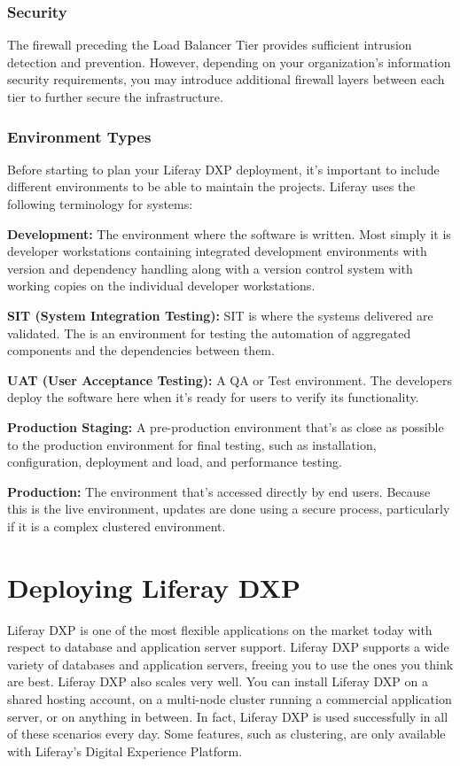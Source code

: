 \subsection{Security}\label{security}

The firewall preceding the Load Balancer Tier provides sufficient
intrusion detection and prevention. However, depending on your
organization's information security requirements, you may introduce
additional firewall layers between each tier to further secure the
infrastructure.

\subsection{Environment Types}\label{environment-types}

Before starting to plan your Liferay DXP deployment, it's important to
include different environments to be able to maintain the projects.
Liferay uses the following terminology for systems:

\textbf{Development:} The environment where the software is written.
Most simply it is developer workstations containing integrated
development environments with version and dependency handling along with
a version control system with working copies on the individual developer
workstations.

\textbf{SIT (System Integration Testing):} SIT is where the systems
delivered are validated. The is an environment for testing the
automation of aggregated components and the dependencies between them.

\textbf{UAT (User Acceptance Testing):} A QA or Test environment. The
developers deploy the software here when it's ready for users to verify
its functionality.

\textbf{Production Staging:} A pre-production environment that's as
close as possible to the production environment for final testing, such
as installation, configuration, deployment and load, and performance
testing.

\textbf{Production:} The environment that's accessed directly by end
users. Because this is the live environment, updates are done using a
secure process, particularly if it is a complex clustered environment.

\chapter{Deploying Liferay DXP}\label{deploying-liferay-dxp}

Liferay DXP is one of the most flexible applications on the market today
with respect to database and application server support. Liferay DXP
supports a wide variety of databases and application servers, freeing
you to use the ones you think are best. Liferay DXP also scales very
well. You can install Liferay DXP on a shared hosting account, on a
multi-node cluster running a commercial application server, or on
anything in between. In fact, Liferay DXP is used successfully in all of
these scenarios every day. Some features, such as clustering, are only
available with Liferay's Digital Experience Platform.

